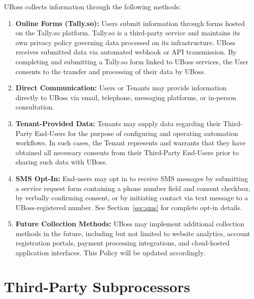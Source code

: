 \documentclass[11pt, letterpaper]{article}
\begin{document}
UBoss collects information through the following methods:

\begin{enumerate}
    \item \textbf{Online Forms (Tally.so):} Users submit information through forms hosted
          on the Tally.so platform. Tally.so is a third-party service and maintains its
          own privacy policy governing data processed on its infrastructure. UBoss receives
          submitted data via automated webhook or API transmission. By completing and
          submitting a Tally.so form linked to UBoss services, the User consents to the
          transfer and processing of their data by UBoss.

    \item \textbf{Direct Communication:} Users or Tenants may provide information directly
          to UBoss via email, telephone, messaging platforms, or in-person consultation.

    \item \textbf{Tenant-Provided Data:} Tenants may supply data regarding their
          Third-Party End-Users for the purpose of configuring and operating automation
          workflows. In such cases, the Tenant represents and warrants that they have
          obtained all necessary consents from their Third-Party End-Users prior to sharing
          such data with UBoss.

    \item \textbf{SMS Opt-In:} End-users may opt in to receive SMS messages by submitting
          a service request form containing a phone number field and consent checkbox, by
          verbally confirming consent, or by initiating contact via text message to a
          UBoss-registered number. See Section~\ref{sec:sms} for complete opt-in details.

    \item \textbf{Future Collection Methods:} UBoss may implement additional collection
          methods in the future, including but not limited to website analytics, account
          registration portals, payment processing integrations, and cloud-hosted
          application interfaces. This Policy will be updated accordingly.
\end{enumerate}

\section{Third-Party Subprocessors}
\end{document}
